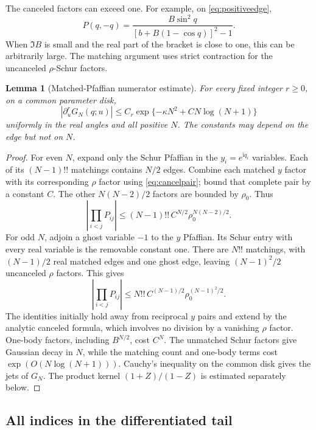 \documentclass[11pt]{article}
\numberwithin{equation}{section}
\newtheorem{lemma}[theorem]{Lemma}
\theoremstyle{definition}
\newcommand{\ii}{\mathrm i}
\begin{document}
The canceled factors can exceed one. For example, on
\eqref{eq:positiveedge},
\[
 P(q,-q)=\frac{B\sin^2q}
               {[b+B(1-\cos q)]^2-1}.
\]
When $\Im B$ is small and the real part of the bracket is close to one,
this can be arbitrarily large. The matching argument uses strict
contraction for the uncanceled $\rho$-Schur factors.

\begin{lemma}[Matched-Pfaffian numerator estimate]\label{lem:matching}
For every fixed integer $r\ge0$, on a common parameter disk,
\[
 |\partial_u^rG_N(q;u)|
 \le C_r\exp\{-\kappa N^2+C N\log(N+1)\}
\]
uniformly in the real angles and all positive $N$. The constants may
depend on the edge but not on $N$.
\end{lemma}
\begin{proof}
For even $N$, expand only the Schur Pfaffian in the $y_i=e^{\ii q_i}$
variables. Each of its $(N-1)!!$ matchings contains $N/2$ edges. Combine
each matched $y$ factor with its corresponding $\rho$ factor using
\eqref{eq:cancelpair}; bound that complete pair by a constant $C$.
The other $N(N-2)/2$ factors are bounded by $\rho_0$. Thus
\[
 \left|\prod_{i<j}P_{ij}\right|
 \le (N-1)!!\,C^{N/2}\rho_0^{N(N-2)/2}.
\]
For odd $N$, adjoin a ghost variable $-1$ to the $y$ Pfaffian.
Its Schur entry with every real variable is the removable constant one.
There are $N!!$ matchings, with $(N-1)/2$ real matched edges and one
ghost edge, leaving $(N-1)^2/2$ uncanceled $\rho$ factors. This gives
\[
 \left|\prod_{i<j}P_{ij}\right|
 \le N!!\,C^{(N-1)/2}\rho_0^{(N-1)^2/2}.
\]
The identities initially hold away from reciprocal $y$ pairs and
extend by the analytic canceled formula, which involves no division
by a vanishing $\rho$ factor. One-body factors, including $B^{N/2}$,
cost $C^N$.
The unmatched Schur factors give Gaussian decay in $N$, while the
matching count and one-body terms cost $\exp(O(N\log(N+1)))$.
Cauchy's inequality on the common disk gives the jets of $G_N$.
The product kernel $(1+Z)/(1-Z)$ is estimated separately below.
\end{proof}

\subsection{All indices in the differentiated tail}
\end{document}
